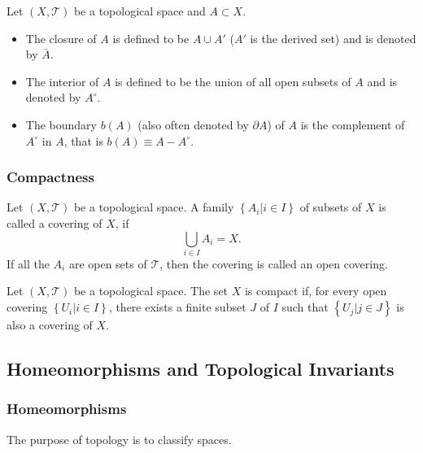 \documentclass[10pt]{article}
\begin{document}
\begin{definition}
    Let $(X,\mathcal{T})$ be a topological space and $A\subset X$.
    \begin{itemize}
        \item The closure of $A$ is defined to be $A\cup A'$ ($A'$ is the derived set) and is denoted by $\bar{A}$.
        \item The interior of $A$ is defined to be the union of all open subsets of $A$ and is denoted by $A^\circ$.
        \item The boundary $b(A)$ (also often denoted by $\partial A$) of $A$ is the complement of $A^\circ$ in $A$, that is $b(A)\equiv A-A^\circ$.
    \end{itemize}
\end{definition}

\subsubsection{Compactness}
\begin{definition}[Covering]
    Let $(X,\mathcal{T})$ be a topological space.
    A family $\left\{A_i\vert i\in I\right\}$ of subsets of $X$ is called a covering of $X$, if 
    \begin{equation}
        \bigcup_{i\in I} A_i=X.
    \end{equation}
    If all the $A_i$ are open sets of $\mathcal{T}$, then the covering is called an open covering.
\end{definition}

\begin{definition}[Compactness]
    Let $(X,\mathcal{T})$ be a topological space.
    The set $X$ is compact if, for every open covering $\left\{U_i\vert i\in I\right\}$, there exists a finite subset $J$ of $I$ such that $\left\{U_j\vert j\in J\right\}$ is also a covering of $X$.
\end{definition}

\subsection{Homeomorphisms and Topological Invariants}
\subsubsection{Homeomorphisms}
\begin{intu}
    The purpose of topology is to classify spaces.
\end{intu}
\end{document}
